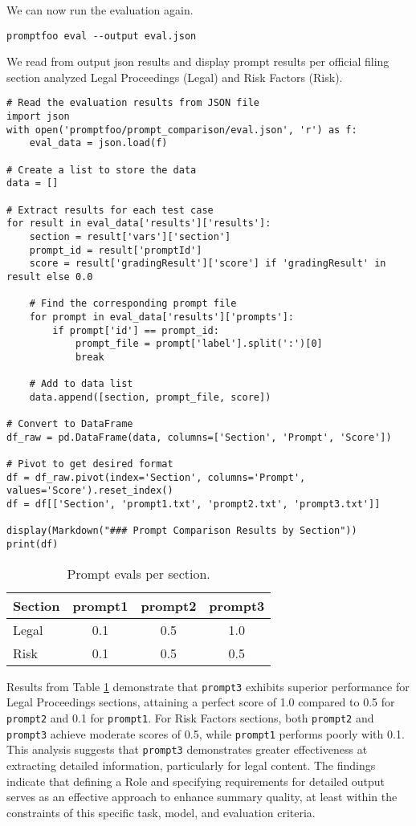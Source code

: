 We can now run the evaluation again.

\begin{verbatim}
promptfoo eval --output eval.json
\end{verbatim}

We read from output json results and display prompt results per official filing section analyzed Legal Proceedings (Legal) and Risk Factors (Risk).
\begin{verbatim}
# Read the evaluation results from JSON file
import json
with open('promptfoo/prompt_comparison/eval.json', 'r') as f:
    eval_data = json.load(f)

# Create a list to store the data
data = []

# Extract results for each test case
for result in eval_data['results']['results']:
    section = result['vars']['section']
    prompt_id = result['promptId']
    score = result['gradingResult']['score'] if 'gradingResult' in result else 0.0
    
    # Find the corresponding prompt file
    for prompt in eval_data['results']['prompts']:
        if prompt['id'] == prompt_id:
            prompt_file = prompt['label'].split(':')[0]
            break
            
    # Add to data list
    data.append([section, prompt_file, score])

# Convert to DataFrame
df_raw = pd.DataFrame(data, columns=['Section', 'Prompt', 'Score'])

# Pivot to get desired format
df = df_raw.pivot(index='Section', columns='Prompt', values='Score').reset_index()
df = df[['Section', 'prompt1.txt', 'prompt2.txt', 'prompt3.txt']]

display(Markdown("### Prompt Comparison Results by Section"))
print(df)
\end{verbatim}

\begin{table}
\centering
\begin{tabular}{lccc}
\hline
Section & prompt1 & prompt2 & prompt3 \\
\hline
Legal & 0.1 & 0.5 & 1.0 \\
Risk & 0.1 & 0.5 & 0.5 \\
\hline
\end{tabular}
\caption{Prompt evals per section.}
\label{tab:prompt}
\end{table}

Results from Table \ref{tab:prompt} demonstrate that \texttt{prompt3} exhibits superior performance for Legal Proceedings sections, attaining a perfect score of 1.0 compared to 0.5 for \texttt{prompt2} and 0.1 for \texttt{prompt1}. For Risk Factors sections, both \texttt{prompt2} and \texttt{prompt3} achieve moderate scores of 0.5, while \texttt{prompt1} performs poorly with 0.1. This analysis suggests that \texttt{prompt3} demonstrates greater effectiveness at extracting detailed information, particularly for legal content. The findings indicate that defining a Role and specifying requirements for detailed output serves as an effective approach to enhance summary quality, at least within the constraints of this specific task, model, and evaluation criteria.

